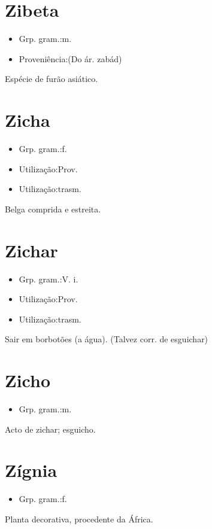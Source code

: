 \section{Zibeta}
\begin{itemize}
\item {Grp. gram.:m.}
\end{itemize}
\begin{itemize}
\item {Proveniência:(Do ár. \textunderscore zabád\textunderscore )}
\end{itemize}
Espécie de furão asiático.
\section{Zicha}
\begin{itemize}
\item {Grp. gram.:f.}
\end{itemize}
\begin{itemize}
\item {Utilização:Prov.}
\end{itemize}
\begin{itemize}
\item {Utilização:trasm.}
\end{itemize}
Belga comprida e estreita.
\section{Zichar}
\begin{itemize}
\item {Grp. gram.:V. i.}
\end{itemize}
\begin{itemize}
\item {Utilização:Prov.}
\end{itemize}
\begin{itemize}
\item {Utilização:trasm.}
\end{itemize}
Sair em borbotões (a água).
(Talvez corr. de \textunderscore esguichar\textunderscore )
\section{Zicho}
\begin{itemize}
\item {Grp. gram.:m.}
\end{itemize}
Acto de zichar; esguicho.
\section{Zígnia}
\begin{itemize}
\item {Grp. gram.:f.}
\end{itemize}
Planta decorativa, procedente da África.
